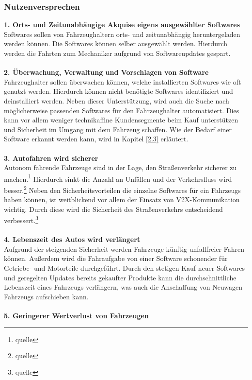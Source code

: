\subsubsection{Nutzenversprechen} \label{nv}
\textbf{1. Orts- und Zeitunabhängige Akquise eigens ausgewählter Softwares}\\
Softwares sollen von Fahrzeughaltern orts- und zeitunabhängig heruntergeladen werden können. Die Softwares können selber ausgewählt werden. Hierdurch werden die Fahrten zum Mechaniker aufgrund von Softwareupdates gespart.\\\\
\textbf{2. Überwachung, Verwaltung und Vorschlagen von Software}\\
Fahrzeughalter sollen überwachen können, welche installierten Softwares wie oft genutzt werden. Hierdurch können nicht benötigte Softwares identifiziert und deinstalliert werden. Neben dieser Unterstützung, wird auch die Suche nach möglicherweise passenden Softwares für den Fahrzeughalter automatisiert. Dies kann vor allem weniger technikaffine Kundensegmente beim Kauf unterstützen und Sicherheit im Umgang mit dem Fahrzeug schaffen. Wie der Bedarf einer Software erkannt werden kann, wird in Kapitel \ref{2.3} erläutert.\\\\
\textbf{3. Autofahren wird sicherer}\\
Autonom fahrende Fahrzeuge sind in der Lage, den Straßenverkehr sicherer zu machen.\footnote{quelle} Hierdurch sinkt die Anzahl an Unfällen und der Verkehrsfluss wird besser.\footnote{quelle} Neben den Sicherheitsvorteilen die einzelne Softwares für ein Fahrzeugs haben können, ist weitblickend vor allem der Einsatz von V2X-Kommunikation wichtig. Durch diese wird die Sicherheit des Straßenverkehrs entscheidend verbessert.\footnote{quelle}\\\\
\textbf{4. Lebenszeit des Autos wird verlängert}\\
Aufgrund der steigenden Sicherheit werden Fahrzeuge künftig unfallfreier Fahren können. Außerdem wird die Fahraufgabe von einer Software schonender für Getriebe- und Motorteile durchgeführt. Durch den stetigen Kauf neuer Softwares und geregelten Updates bereits gekaufter Produkte kann die durchschnittliche Lebenszeit eines Fahrzeugs verlängern, was auch die Anschaffung von Neuwagen Fahrzeugs aufschieben kann.\\\\
\textbf{5. Geringerer Wertverlust von Fahrzeugen}\\
